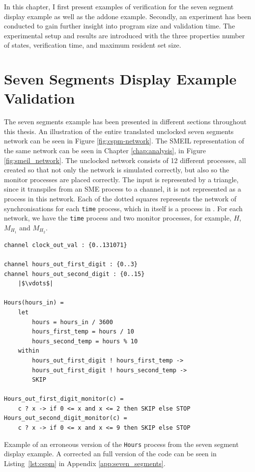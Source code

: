 
In this chapter, I first present examples of verification for the seven segment display example as well as the addone example. Secondly, an experiment has been conducted to gain further insight into program size and validation time. The experimental setup and results are introduced with the three properties number of states, verification time, and maximum resident set size.
\section{Seven Segments Display Example Validation}
The seven segments example has been presented in different sections throughout this thesis. An illustration of the entire translated unclocked seven segments network can be seen in Figure \ref{fig:cspm-network}. The SMEIL representation of the same network can be seen in Chapter \ref{chap:analysis}, in Figure \ref{fig:smeil_network}.
The unclocked \cspm{} network consists of 12 different processes, all created so that not only the network is simulated correctly, but also so the monitor processes are placed correctly. The input is represented by a triangle, since it transpiles from an SME process to a \cspm{} channel, it is not represented as a process in this network. Each of the dotted squares represents the network of synchronisations for each \texttt{time} process, which in itself is a process in \cspm{}. For each network, we have the \texttt{time} process and two monitor processes, for example, $H$, $M_{H_1}$ and $M_{H_2}$.
\\

\begin{listing}
\begin{verbatim}
channel clock_out_val : {0..131071}

channel hours_out_first_digit : {0..3}
channel hours_out_second_digit : {0..15}
    |$\vdots$|

Hours(hours_in) =
    let
        hours = hours_in / 3600
        hours_first_temp = hours / 10
        hours_second_temp = hours % 10
    within
        hours_out_first_digit ! hours_first_temp ->
        hours_out_first_digit ! hours_second_temp ->
        SKIP

Hours_out_first_digit_monitor(c) =
    c ? x -> if 0 <= x and x <= 2 then SKIP else STOP
Hours_out_second_digit_monitor(c) =
    c ? x -> if 0 <= x and x <= 9 then SKIP else STOP

\end{verbatim}
\caption{Example of an erroneous version of the \texttt{Hours} process from the \cspm{} seven segment display example. A corrected an full version of the code can be seen in Listing~\ref{lst:cspm} in Appendix \ref{app:seven_segments}.}
\label{lst:cspm_error}
\end{listing}

